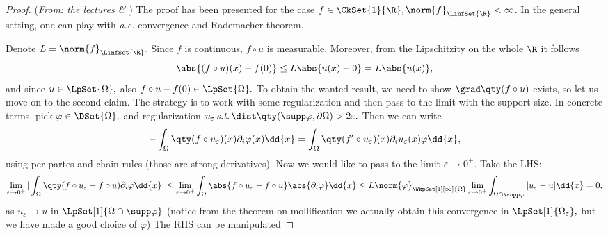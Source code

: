 \begin{proof}(\textit{From: the lectures \& \cite{bulicekUvodModerniTeorie2018}})
	The proof has been presented for the case $f \in \CkSet{1}{\R}, \norm{f}_{\LinfSet{\R}} < \infty$. In the general setting, one can play with \textit{a.e.} convergence and Rademacher theorem.

	Denote $L = \norm{f}_{\LinfSet{\R}}.$ Since $f$ is continuous, $f \circ u$ is measurable. Moreover, from the Lipschitzity on the whole $\R$ it follows
	\[
		\abs{(f \circ u)(x) - f(0)} \leq L \abs{u(x) - 0} = L \abs{u(x)},
	\]
	and since $u \in \LpSet{\Omega},$ also $f\circ u - f(0) \in \LpSet{\Omega}.$ To obtain the wanted result, we need to show $\grad\qty(f \circ u)$ exists, so let us move on to the second claim. The strategy is to work with some regularization and then pass to the limit with the support size. In concrete terms, pick $\varphi \in \DSet{\Omega},$ and regularization $u_{\varepsilon} \, \text{\textit{s.t.}} \, \dist\qty(\supp \varphi, \partial \Omega) > 2 \varepsilon.$ Then we can write
	\[
		- \int_{\Omega}\qty(f \circ u_{\varepsilon})(x) \partial_{i}\varphi(x)\dd{x} = \int_{\Omega}\qty(f' \circ u_{\varepsilon})(x)\partial_{i}u_{\varepsilon}(x)\varphi \dd{x},
	\]
using per partes and chain rules (those are strong derivatives). Now we would like to pass to the limit $\varepsilon \to 0^+.$ Take the LHS:
\[
	\lim_{\varepsilon\to 0^{+}}|\int_{\Omega}\qty(f \circ u_{\varepsilon} - f \circ u)\partial_{i}\varphi \dd{x}| \leq \lim_{\varepsilon \to 0^{+}}\int_{\Omega}\abs{f \circ u_{\varepsilon} - f \circ u}\abs{\partial_{i}\varphi}\dd{x} \leq L \norm{\varphi}_{\WkpSet[1][\infty]{\Omega}}\lim_{\varepsilon \to 0^+}\int_{\Omega \cap \supp \varphi}|u_{\varepsilon} - u|\dd{x} = 0,
\]
as $u_{\varepsilon} \to u$ in $\LpSet[1]{\Omega \cap \supp \varphi}$ (notice from the theorem on mollification we actually obtain this convergence in $\LpSet[1]{\Omega_{\varepsilon}},$ but we have made a good choice of $\varphi$) The RHS can be manipulated


\end{proof}
